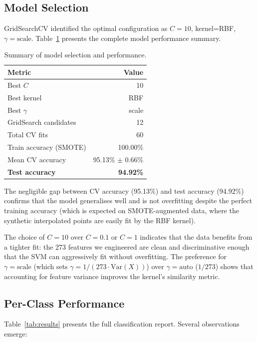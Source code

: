 \documentclass[10pt,twocolumn,letterpaper]{article}
\begin{document}
\subsection{Model Selection}
GridSearchCV identified the optimal configuration as $C=10$, kernel=RBF, $\gamma=\text{scale}$. Table~\ref{tab:model_summary} presents the complete model performance summary.

\begin{table}[H]
\centering
\caption{Summary of model selection and performance.}
\label{tab:model_summary}
\small
\begin{tabular}{lr}
\toprule
\textbf{Metric} & \textbf{Value} \\
\midrule
Best $C$ & 10 \\
Best kernel & RBF \\
Best $\gamma$ & scale \\
GridSearch candidates & 12 \\
Total CV fits & 60 \\
\midrule
Train accuracy (SMOTE) & 100.00\% \\
Mean CV accuracy & 95.13\% $\pm$ 0.66\% \\
\textbf{Test accuracy} & \textbf{94.92\%} \\
\bottomrule
\end{tabular}
\end{table}

The negligible gap between CV accuracy (95.13\%) and test accuracy (94.92\%) confirms that the model generalises well and is not overfitting despite the perfect training accuracy (which is expected on SMOTE-augmented data, where the synthetic interpolated points are easily fit by the RBF kernel).

The choice of $C=10$ over $C=0.1$ or $C=1$ indicates that the data benefits from a tighter fit: the 273 features we engineered are clean and discriminative enough that the SVM can aggressively fit without overfitting. The preference for $\gamma=\text{scale}$ (which sets $\gamma = 1/(273 \cdot \text{Var}(X))$) over $\gamma=\text{auto}$ ($1/273$) shows that accounting for feature variance improves the kernel's similarity metric.

\subsection{Per-Class Performance}
Table~\ref{tab:results} presents the full classification report. Several observations emerge:
\end{document}
